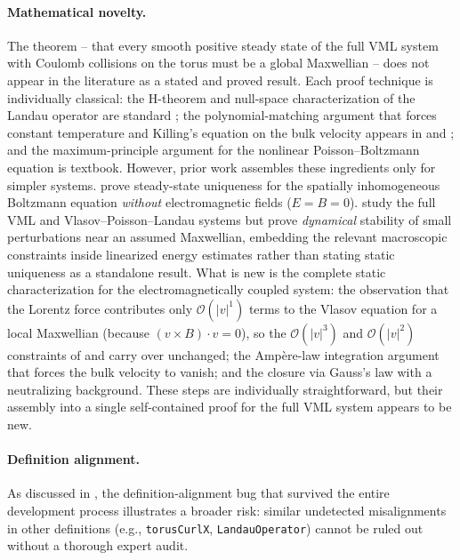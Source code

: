 \documentclass[11pt]{article}
\begin{document}
\paragraph{Mathematical novelty.} The theorem -- that every smooth positive steady state of the full VML system with Coulomb collisions on the torus must be a global Maxwellian -- does not appear in the literature as a stated and proved result. Each proof technique is individually classical: the H-theorem and null-space characterization of the Landau operator are standard \citep{villani2002,cercignani1988}; the polynomial-matching argument that forces constant temperature and Killing's equation on the bulk velocity appears in \citet{cercignani1988} and \citet{desvillettes2005}; and the maximum-principle argument for the nonlinear Poisson--Boltzmann equation is textbook. However, prior work assembles these ingredients only for simpler systems. \citet{desvillettes2005} prove steady-state uniqueness for the spatially inhomogeneous Boltzmann equation \emph{without} electromagnetic fields ($E = B = 0$). \citet{guo2003,guo2012} study the full VML and Vlasov--Poisson--Landau systems but prove \emph{dynamical} stability of small perturbations near an assumed Maxwellian, embedding the relevant macroscopic constraints inside linearized energy estimates rather than stating static uniqueness as a standalone result. What is new is the complete static characterization for the electromagnetically coupled system: the observation that the Lorentz force contributes only $\mathcal{O}(|v|^1)$ terms to the Vlasov equation for a local Maxwellian (because $(v \times B) \cdot v = 0$), so the $\mathcal{O}(|v|^3)$ and $\mathcal{O}(|v|^2)$ constraints of \citet{cercignani1988} and \citet{desvillettes2005} carry over unchanged; the Amp\`ere-law integration argument that forces the bulk velocity to vanish; and the closure via Gauss's law with a neutralizing background. These steps are individually straightforward, but their assembly into a single self-contained proof for the full VML system appears to be new.

\paragraph{Definition alignment.} As discussed in , the definition-alignment bug that survived the entire development process illustrates a broader risk: similar undetected misalignments in other definitions (e.g., \texttt{torusCurlX}, \texttt{LandauOperator}) cannot be ruled out without a thorough expert audit.
\end{document}
